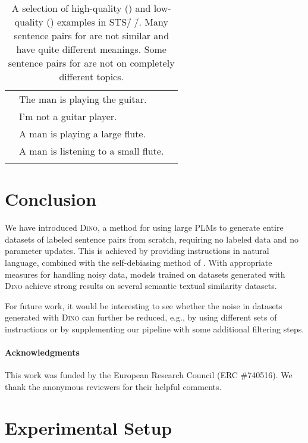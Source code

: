 \documentclass[11pt]{article}
\newcommand{\cmark}{{\color{c2}\ding{51}}}\newcommand{\xmark}{{\color{c1}\ding{55}}}
\newcommand\ours{\textsc{Dino}}
\newcommand\ourDsSemi{STS\=/🦕\=/}
\begin{document}
\begin{table}
\begin{tabularx}{\linewidth}{cXc}
		\cmidrule{2-3}
		&  The man is playing the guitar. & \multirow{2}{*}{\xmark} \\
		&  I'm not a guitar player. & \\
		\cmidrule{2-3}
		&  A man is playing a large flute. & \multirow{2}{*}{\xmark} \\
		&  A man is listening to a small flute. & \\
		\arrayrulecolor{black}
		\bottomrule
	\end{tabularx} 
	\caption{A selection of high-quality (\cmark) and low-quality (\xmark) examples in \ourDsSemi{}. Many sentence pairs for  are not similar and have quite different meanings. Some sentence pairs for  are not on completely different topics.}  
	\label{table:qualitative-analysis}
\end{table}


\section{Conclusion}

We have introduced \ours{}, a method for using large PLMs to generate entire datasets of labeled sentence pairs from scratch, requiring no labeled data and no parameter updates. This is achieved by providing instructions in natural language, combined with the self-debiasing method of \citet{schick2021selfdiagnosis}. With appropriate measures for handling noisy data, models trained on datasets generated with \ours{} achieve strong results on several semantic textual similarity datasets. 

For future work, it would be interesting to see whether the noise in datasets generated with \ours{} can further be reduced, e.g., by using different sets of instructions \citep{jiang2019know,schick2020exploiting} or by supplementing our pipeline with some additional filtering steps.

\paragraph*{Acknowledgments}
This work was funded by the European Research Council (ERC \#740516).
We thank the anonymous reviewers
for their helpful comments.




\clearpage
\appendix
\section{Experimental Setup}
\end{document}
